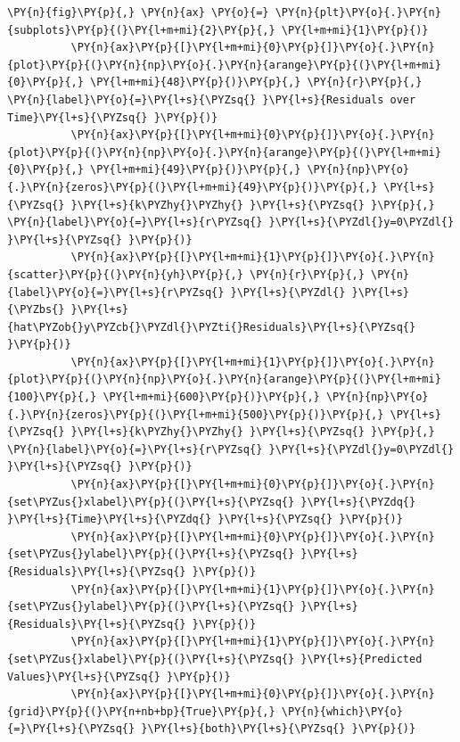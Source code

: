 \documentclass[10pt]{article}\usepackage[]{graphicx}\usepackage[]{xcolor}
\begin{document}
    \begin{Verbatim}[commandchars=\\\{\}]
 \PY{n}{fig}\PY{p}{,} \PY{n}{ax} \PY{o}{=} \PY{n}{plt}\PY{o}{.}\PY{n}{subplots}\PY{p}{(}\PY{l+m+mi}{2}\PY{p}{,} \PY{l+m+mi}{1}\PY{p}{)}
          \PY{n}{ax}\PY{p}{[}\PY{l+m+mi}{0}\PY{p}{]}\PY{o}{.}\PY{n}{plot}\PY{p}{(}\PY{n}{np}\PY{o}{.}\PY{n}{arange}\PY{p}{(}\PY{l+m+mi}{0}\PY{p}{,} \PY{l+m+mi}{48}\PY{p}{)}\PY{p}{,} \PY{n}{r}\PY{p}{,} \PY{n}{label}\PY{o}{=}\PY{l+s}{\PYZsq{} }\PY{l+s}{Residuals over Time}\PY{l+s}{\PYZsq{} }\PY{p}{)}
          \PY{n}{ax}\PY{p}{[}\PY{l+m+mi}{0}\PY{p}{]}\PY{o}{.}\PY{n}{plot}\PY{p}{(}\PY{n}{np}\PY{o}{.}\PY{n}{arange}\PY{p}{(}\PY{l+m+mi}{0}\PY{p}{,} \PY{l+m+mi}{49}\PY{p}{)}\PY{p}{,} \PY{n}{np}\PY{o}{.}\PY{n}{zeros}\PY{p}{(}\PY{l+m+mi}{49}\PY{p}{)}\PY{p}{,} \PY{l+s}{\PYZsq{} }\PY{l+s}{k\PYZhy{}\PYZhy{} }\PY{l+s}{\PYZsq{} }\PY{p}{,} \PY{n}{label}\PY{o}{=}\PY{l+s}{r\PYZsq{} }\PY{l+s}{\PYZdl{}y=0\PYZdl{} }\PY{l+s}{\PYZsq{} }\PY{p}{)}
          \PY{n}{ax}\PY{p}{[}\PY{l+m+mi}{1}\PY{p}{]}\PY{o}{.}\PY{n}{scatter}\PY{p}{(}\PY{n}{yh}\PY{p}{,} \PY{n}{r}\PY{p}{,} \PY{n}{label}\PY{o}{=}\PY{l+s}{r\PYZsq{} }\PY{l+s}{\PYZdl{} }\PY{l+s}{\PYZbs{} }\PY{l+s}{hat\PYZob{}y\PYZcb{}\PYZdl{}\PYZti{}Residuals}\PY{l+s}{\PYZsq{} }\PY{p}{)}
          \PY{n}{ax}\PY{p}{[}\PY{l+m+mi}{1}\PY{p}{]}\PY{o}{.}\PY{n}{plot}\PY{p}{(}\PY{n}{np}\PY{o}{.}\PY{n}{arange}\PY{p}{(}\PY{l+m+mi}{100}\PY{p}{,} \PY{l+m+mi}{600}\PY{p}{)}\PY{p}{,} \PY{n}{np}\PY{o}{.}\PY{n}{zeros}\PY{p}{(}\PY{l+m+mi}{500}\PY{p}{)}\PY{p}{,} \PY{l+s}{\PYZsq{} }\PY{l+s}{k\PYZhy{}\PYZhy{} }\PY{l+s}{\PYZsq{} }\PY{p}{,} \PY{n}{label}\PY{o}{=}\PY{l+s}{r\PYZsq{} }\PY{l+s}{\PYZdl{}y=0\PYZdl{} }\PY{l+s}{\PYZsq{} }\PY{p}{)}
          \PY{n}{ax}\PY{p}{[}\PY{l+m+mi}{0}\PY{p}{]}\PY{o}{.}\PY{n}{set\PYZus{}xlabel}\PY{p}{(}\PY{l+s}{\PYZsq{} }\PY{l+s}{\PYZdq{} }\PY{l+s}{Time}\PY{l+s}{\PYZdq{} }\PY{l+s}{\PYZsq{} }\PY{p}{)}
          \PY{n}{ax}\PY{p}{[}\PY{l+m+mi}{0}\PY{p}{]}\PY{o}{.}\PY{n}{set\PYZus{}ylabel}\PY{p}{(}\PY{l+s}{\PYZsq{} }\PY{l+s}{Residuals}\PY{l+s}{\PYZsq{} }\PY{p}{)}
          \PY{n}{ax}\PY{p}{[}\PY{l+m+mi}{1}\PY{p}{]}\PY{o}{.}\PY{n}{set\PYZus{}ylabel}\PY{p}{(}\PY{l+s}{\PYZsq{} }\PY{l+s}{Residuals}\PY{l+s}{\PYZsq{} }\PY{p}{)}
          \PY{n}{ax}\PY{p}{[}\PY{l+m+mi}{1}\PY{p}{]}\PY{o}{.}\PY{n}{set\PYZus{}xlabel}\PY{p}{(}\PY{l+s}{\PYZsq{} }\PY{l+s}{Predicted Values}\PY{l+s}{\PYZsq{} }\PY{p}{)}
          \PY{n}{ax}\PY{p}{[}\PY{l+m+mi}{0}\PY{p}{]}\PY{o}{.}\PY{n}{grid}\PY{p}{(}\PY{n+nb+bp}{True}\PY{p}{,} \PY{n}{which}\PY{o}{=}\PY{l+s}{\PYZsq{} }\PY{l+s}{both}\PY{l+s}{\PYZsq{} }\PY{p}{)}

\end{Verbatim}
\end{document}
